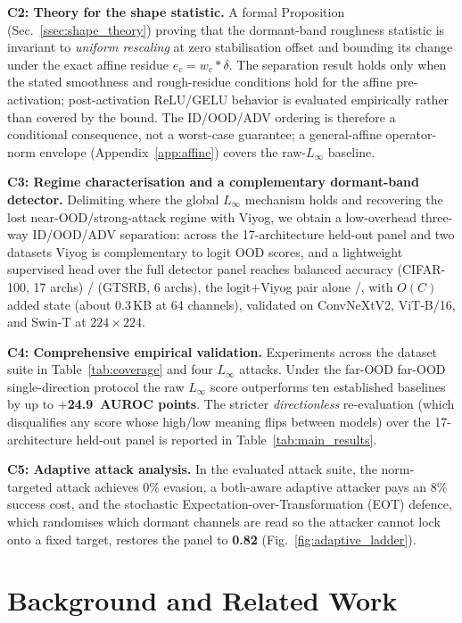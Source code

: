 \documentclass[10pt,letterpaper,journal]{IEEEtran}
\begin{document}
\noindent\textbf{C2: Theory for the shape statistic.} A formal
Proposition (Sec.~\ref{ssec:shape_theory}) proving that the dormant-band roughness
statistic is invariant to \emph{uniform rescaling} at zero stabilisation offset
and bounding its change under the exact affine residue
$e_c=w_c\!\ast\delta$. The separation result holds only when the stated
smoothness and rough-residue conditions hold for the affine pre-activation;
post-activation ReLU/GELU behavior is evaluated empirically rather than covered
by the bound. The ID/OOD/ADV ordering is therefore a conditional consequence,
not a worst-case guarantee; a general-affine operator-norm envelope
(Appendix~\ref{app:affine}) covers the raw-$L_\infty$ baseline.

\noindent\textbf{C3: Regime characterisation and a complementary
dormant-band detector.} Delimiting where the global $L_\infty$ mechanism
holds and recovering the lost near-OOD/strong-attack regime with Viyog, we
obtain a low-overhead three-way ID/OOD/ADV separation: across the
17-architecture held-out panel and two datasets Viyog is complementary to
logit OOD scores, and a lightweight supervised head over the full detector
panel reaches balanced accuracy 
(CIFAR-100, 17 archs) /  (GTSRB, 6 archs), the
logit$+$Viyog pair alone /, with $O(C)$ added state
(about 0.3\,KB at 64 channels), validated on ConvNeXtV2, ViT-B/16, and
Swin-T at $224\times224$.

\noindent\textbf{C4: Comprehensive empirical validation.} Experiments
across the dataset suite in Table~\ref{tab:coverage} and four $L_\infty$
attacks. Under the far-OOD
far-OOD single-direction protocol the raw $L_\infty$ score outperforms ten
established baselines by up to \textbf{$+$24.9~AUROC points}. The stricter
\emph{directionless} re-evaluation (which disqualifies any score whose high/low
meaning flips between models) over the 17-architecture held-out panel is
reported in Table~\ref{tab:main_results}.

\noindent\textbf{C5: Adaptive attack analysis.} In the evaluated attack
suite, the norm-targeted attack achieves $0\%$ evasion, a both-aware adaptive
attacker pays an $8\%$ success cost, and the stochastic
Expectation-over-Transformation (EOT) defence, which randomises which
dormant channels are read so the attacker cannot lock onto a fixed target,
restores the panel to \textbf{0.82} (Fig.~\ref{fig:adaptive_ladder}).

\section{Background and Related Work}
\label{sec:related}
\end{document}
